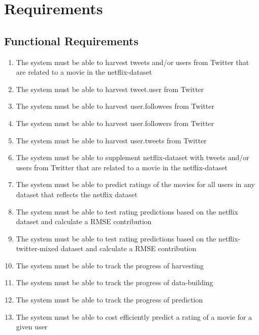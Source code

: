 
\appendix
\clearpage
{}
\setcounter{page}{1}



\chapter{Requirements}\label{app:req}
\section{Functional Requirements}
\begin{enumerate}[label=\bfseries FR \arabic*:]
  \item The system must be able to harvest tweets and/or users from Twitter that are related to a movie in the netflix-dataset
  \item The system must be able to harvest tweet.user from Twitter
  \item The system must be able to harvest user.followees from Twitter
  \item The system must be able to harvest user.followers from Twitter
  \item The system must be able to harvest user.tweets from Twitter
  \item The system must be able to supplement netflix-dataset with tweets and/or users from Twitter that are related to a movie in the netflix-dataset
  \item The system must be able to predict ratings of the movies for all users in any dataset that reflects the netflix dataset
  \item The system must be able to test rating predictions based on the netflix dataset and calculate a RMSE contribution
  \item The system must be able to test rating predictions based on the netflix-twitter-mixed dataset and calculate a RMSE contribution
  \item The system must be able to track the progress of harvesting
  \item The system must be able to track the progress of data-building
  \item The system must be able to track the progress of prediction
  \item The system must be able to cost efficiently predict a rating of a movie for a given user
\end{enumerate}

